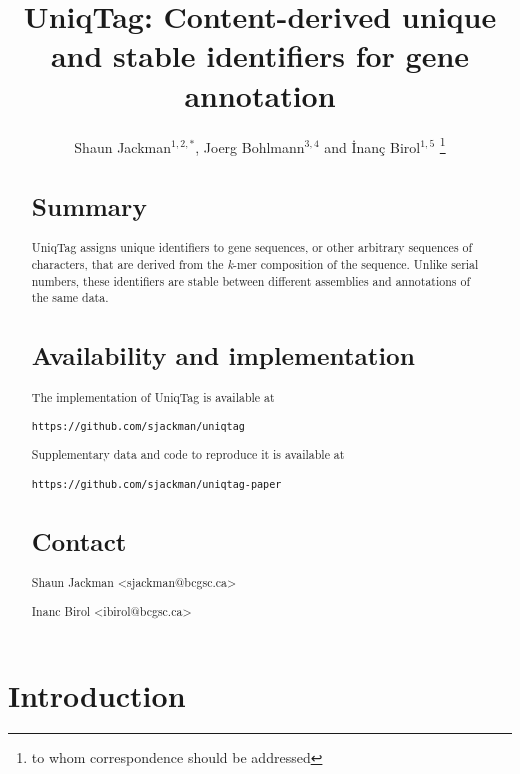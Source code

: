 \documentclass{bioinfo}
\begin{document}

\title[UniqTag]{
UniqTag: Content-derived unique and stable identifiers for gene annotation}
\author[Jackman \textit{et al.}]{
Shaun Jackman$^{1,2,*}$, Joerg Bohlmann$^{3,4}$ and \.{I}nan\c{c} Birol$^{1,5}$
\footnote{to whom correspondence should be addressed}
}

\address{
$^1$Genome Sciences Centre, British Columbia Cancer Agency, Vancouver, BC, Canada
\\$^2$Graduate Program in Bioinformatics, University of British Columbia, Vancouver, BC, Canada
\\$^3$Michael Smith Laboratories, University of British Columbia, Vancouver, BC, Canada
\\$^4$Department of Forest Sciences, University of British Columbia, Vancouver, BC, Canada
\\$^5$Department of Medical Genetics, University of British Columbia, Vancouver, BC, Canada
}



\maketitle

\begin{abstract}
\section{Summary}\label{summary}

UniqTag assigns unique identifiers to gene sequences, or other arbitrary
sequences of characters, that are derived from the \emph{k}-mer
composition of the sequence. Unlike serial numbers, these identifiers
are stable between different assemblies and annotations of the same
data.

\section{Availability and
implementation}\label{availability-and-implementation}

The implementation of UniqTag is available at

\texttt{https://github.com/sjackman/uniqtag}

Supplementary data and code to reproduce it is available at

\texttt{https://github.com/sjackman/uniqtag-paper}

\section{Contact}\label{contact}

Shaun Jackman \textless{}sjackman@bcgsc.ca\textgreater{}

Inanc Birol \textless{}ibirol@bcgsc.ca\textgreater{}

\end{abstract}\section{Introduction}\label{introduction}
\end{document}
